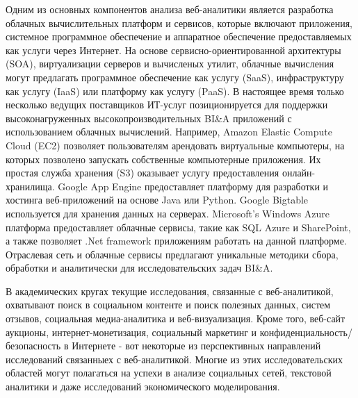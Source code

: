 Одним из основных компонентов анализа веб-аналитики является
разработка облачных вычислительных платформ и сервисов,
которые включают приложения, системное программное обеспечение и аппаратное обеспечение
предоставляемых как услуги через Интернет. На основе сервисно-ориентированной
архитектуры (SOA), виртуализации серверов и вычисленых утилит, облачные вычисления могут предлагать программное обеспечение как услугу (SaaS), инфраструктуру как услугу (IaaS) или платформу
как услугу (PaaS). В настоящее время только несколько ведущих поставщиков ИТ-услуг
позиционируется для поддержки высоконагруженных высокопроизводительных BI\&A
приложений с использованием облачных вычислений. Например, Amazon
Elastic Compute Cloud (EC2) позволяет пользователям арендовать виртуальные
компьютеры, на которых позволено запускать собственные компьютерные приложения.
Их простая служба хранения (S3) оказывает услугу предоставления онлайн-хранилища. Google App Engine предоставляет платформу для разработки
и хостинга веб-приложений на основе Java или Python.
Google Bigtable используется для хранения данных на серверах. Microsoft's Windows Azure платформа предоставляет облачные сервисы, такие как
SQL Azure и SharePoint, а также позволяет .Net framework
приложениям работать на данной платформе. Отраслевая сеть и
облачные сервисы предлагают уникальные методики сбора, обработки и
аналитически для исследовательских задач BI\&A.

В академических кругах текущие исследования, связанные с веб-аналитикой, охватывают
поиск в социальном контенте и поиск полезных данных, систем отзывов, социальная
медиа-аналитика и веб-визуализация. Кроме того, веб-сайт
аукционы, интернет-монетизация, социальный маркетинг и
конфиденциальность/безопасность в Интернете - вот некоторые из перспективных направлений исследований связанныех с веб-аналитикой. Многие из этих
исследовательских областей могут полагаться на успехи в анализе социальных сетей,
текстовой аналитики и даже исследований экономического моделирования.
